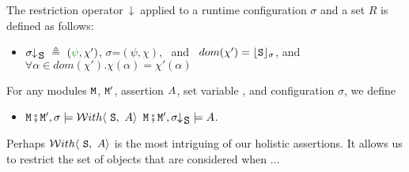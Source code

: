  
 
\begin{definition}   \label{def:restrict}
The restriction operator~$\;\!\!\downarrow\!_{} $ applied to a runtime configuration $\sigma$ and a set $R$ is defined as follows:
 \label{def:config:restrct}
 $~ $

\begin{itemize}
\item
$\restrct {\sigma}{\prg{S}} \ \triangleq \ (\sd{\psi}, \chi')$, \IFF  $\sigma$=$(\psi,\chi)$, \ and  \  $dom(\chi')={\lfloor{ {{\mbox{\tt{S}}}}}\rfloor_{\sigma}}$, and   
 $\forall \alpha\!\in\!dom(\chi').\chi(\alpha)=\chi'(\alpha)$
\end{itemize}
\end{definition}

\begin{definition}  \label{def:valid:assertion:using}
For any modules ${\mbox{\tt{\ensuremath{{\mbox{\tt{M}}}}}}}$, ${\mbox{\tt{\ensuremath{{\mbox{\tt{M}}}}}}}'$, assertion  $A$, set variable ,  and configuration $\sigma$, we define
\begin{itemize}
 \item
 ${\mbox{\tt{\ensuremath{{\mbox{\tt{M}}}}}}}\fatsemi {\mbox{\tt{\ensuremath{{\mbox{\tt{M}}}}}}}', \sigma \models {\mathcal W}ith\langle\ {\mbox{\tt{S}}},\ A\rangle$
 \IFF
 ${\mbox{\tt{\ensuremath{{\mbox{\tt{M}}}}}}}\fatsemi {\mbox{\tt{\ensuremath{{\mbox{\tt{M}}}}}}}', \sigma\!\!\downarrow\!_{{\mbox{\tt{S}}}} \models  A  $.
\end{itemize}
\end{definition}

Perhaps ${\mathcal W}ith\langle\ {\mbox{\tt{S}}},\ A\rangle$ is the most intriguing of our holistic assertions. It allows us to restrict the set of objects that are considered when ...


